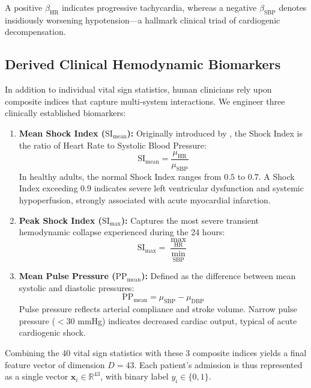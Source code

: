 A positive $\beta_{\text{HR}}$ indicates progressive tachycardia, whereas a negative $\beta_{\text{SBP}}$ denotes insidiously worsening hypotension—a hallmark clinical triad of cardiogenic decompensation.

\subsection{Derived Clinical Hemodynamic Biomarkers}
\label{subsec:derived_biomarkers}

In addition to individual vital sign statistics, human clinicians rely upon composite indices that capture multi-system interactions. We engineer three clinically established biomarkers:

\begin{enumerate}
    \item \textbf{Mean Shock Index ($\text{SI}_{\text{mean}}$):} Originally introduced by \citet{allgower1967shock}, the Shock Index is the ratio of Heart Rate to Systolic Blood Pressure:
    \begin{equation}
    \text{SI}_{\text{mean}} = \frac{\mu_{\text{HR}}}{\mu_{\text{SBP}}}
    \end{equation}
    In healthy adults, the normal Shock Index ranges from $0.5$ to $0.7$. A Shock Index exceeding $0.9$ indicates severe left ventricular dysfunction and systemic hypoperfusion, strongly associated with acute myocardial infarction.
    
    \item \textbf{Peak Shock Index ($\text{SI}_{\text{max}}$):} Captures the most severe transient hemodynamic collapse experienced during the 24 hours:
    \begin{equation}
    \text{SI}_{\text{max}} = \frac{\max_{\text{HR}}}{\min_{\text{SBP}}}
    \end{equation}
    
    \item \textbf{Mean Pulse Pressure ($\text{PP}_{\text{mean}}$):} Defined as the difference between mean systolic and diastolic pressures:
    \begin{equation}
    \text{PP}_{\text{mean}} = \mu_{\text{SBP}} - \mu_{\text{DBP}}
    \end{equation}
    Pulse pressure reflects arterial compliance and stroke volume. Narrow pulse pressure ($< 30$ mmHg) indicates decreased cardiac output, typical of acute cardiogenic shock.
\end{enumerate}

Combining the 40 vital sign statistics with these 3 composite indices yields a final feature vector of dimension $D = 43$. Each patient's admission is thus represented as a single vector $\mathbf{x}_i \in \mathbb{R}^{43}$, with binary label $y_i \in \{0, 1\}$.

